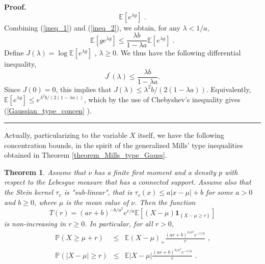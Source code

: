 \documentclass[11pt]{article}
\newtheorem{theorem}{Theorem}
\newenvironment{proof}[1][Proof]{\noindent\textbf{#1.} }{\ \rule{0.5em}{0.5em}}
\begin{document}
\begin{proof}
\begin{equation}
\mathbb{E}\left[ e^{\lambda g}\right] \text{ .}  \label{ineq_2}
\end{equation}%
Combining (\ref{ineq_1}) and (\ref{ineq_2}), we obtain, for any $\lambda
<1/a $,%
\begin{equation*}
\mathbb{E}\left[ ge^{\lambda g}\right] \leq \frac{\lambda b}{1-\lambda a}%
\mathbb{E}\left[ e^{\lambda g}\right] \text{ .}
\end{equation*}%
Define $J\left( \lambda \right) =\log \mathbb{E}\left[ e^{\lambda g}\right] $%
, $\lambda \geq 0$. We thus have the following differential inequality, 
\begin{equation*}
J^{\prime }\left( \lambda \right) \leq \frac{\lambda b}{1-\lambda a}.
\end{equation*}%
Since $J\left( 0\right) =0$, this implies that $J\left( \lambda \right) \leq
\lambda ^{2}b/\left( 2(1-\lambda a)\right) $. Equivalently, $\mathbb{E}\left[
e^{\lambda g}\right] \leq e^{\lambda ^{2}b/\left( 2(1-\lambda a)\right) }$,
which by the use of Chebyshev's inequality gives (\ref{Gaussian_type_concen}%
).
\end{proof}

Actually, particularizing to the variable $X$ itself, we have the following
concentration bounds, in the spirit of the generalized Mills' type
inequalities obtained in Theorem \ref{theorem_Mills_type_Gauss}.

\begin{theorem}
\label{theorem_Mills_type_Gamma}Assume that $\nu $ has a finite first moment
and a density $p$ with respect to the Lebesgue measure that has a connected
support. Assume also that the Stein kernel $\tau _{v}$ is "sub-linear", that
is $\tau _{v}(x)\leq a\left\vert x-\mu \right\vert +b$ for some $a>0$ and $%
b\geq 0$, where $\mu $ is the mean value of $\nu $. Then the function%
\begin{equation*}
T\left( r\right) =\left( ar+b\right) ^{-b/a^{2}}e^{r/a}\mathbb{E}\left[
\left( X-\mu \right) \mathbf{1}_{\left\{ X-\mu \geq r\right\} }\right]
\end{equation*}%
is non-increasing in $r\geq 0$. In particular, for all $r>0$,%
\begin{eqnarray}
\mathbb{P}\left( X\geq \mu +r\right) &\leq &\mathbb{E}\left( X-\mu \right)
_{+}\frac{\left( ar+b\right) ^{b/a^{2}}e^{-r/a}}{r}\text{ ,}
\label{ineq_Mills_right_gamma} \\
\mathbb{P}\left( \left\vert X-\mu \right\vert \geq r\right) &\leq &\mathbb{E}%
\left\vert X-\mu \right\vert \frac{\left( ar+b\right) ^{b/a^{2}}e^{-r/a}}{r}%
\text{ .}  \label{ineq_Mills_left_gamma}
\end{eqnarray}
\end{theorem}
\end{document}

